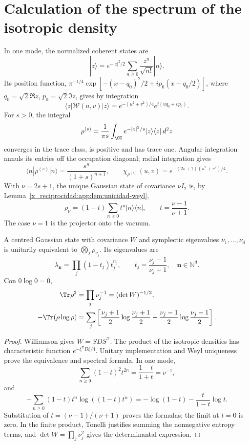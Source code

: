 \section{Calculation of the spectrum of the isotropic density}
In one mode, the normalized coherent states are
\[
 |z\rangle=e^{-|z|^2/2}\sum_{n\geq0}\frac{z^n}{\sqrt{n!}}|n\rangle.
\]
Its position function,
\(\pi^{-1/4}\exp[-(x-q_0)^2/2+ip_0(x-q_0/2)]\), where
\(q_0=\sqrt2\Re z\), \(p_0=\sqrt2\Im z\), gives by integration
\[
 \langle z|\mathcal W(u,v)|z\rangle
 =e^{-(u^2+v^2)/4}e^{i(uq_0+vp_0)}.
\]
For \(s>0\), the integral
\[
 \rho^{(s)}=\frac1{\pi s}\int_{\CC} e^{-|z|^2/s}
 |z\rangle\langle z|\,d^2z
\]
converges in the trace class, is positive and has trace one. Angular
integration annuls its entries off the occupation diagonal;
radial integration gives
\[
 \langle n|\rho^{(s)}|n\rangle=\frac{s^n}{(1+s)^{n+1}},\qquad
 \chi_{\rho^{(s)}}(u,v)=e^{-(2s+1)(u^2+v^2)/4}.
\]
With \(\nu=2s+1\), the unique Gaussian state of covariance
\(\nu I_2\) is, by Lemma~\ref{x_reciprocidad:app:lem:unicidad-weyl},
\begin{equation}
 \rho_\nu=(1-t)\sum_{n\geq0}t^n|n\rangle\langle n|,
 \qquad t=\frac{\nu-1}{\nu+1}.
 \label{x_reciprocidad:app:eq:estado-geometrico}
\end{equation}
The case \(\nu=1\) is the projector onto the vacuum.

\begin{theorem}
\label{x_reciprocidad:app:thm:espectro-gaussiano}
A centred Gaussian state with covariance \(W\) and symplectic eigenvalues \(\nu_1,\ldots,\nu_d\) is unitarily equivalent to \(\bigotimes_j\rho_{\nu_j}\). Its eigenvalues are
\[
 \lambda_{\symbf{n}}=\prod_j(1-t_j)t_j^{n_j},\qquad
 t_j=\frac{\nu_j-1}{\nu_j+1},\quad \symbf{n}\in\mathbb N^d.
\]
Con \(0\log0=0\),
\begin{align}
 \Tr\rho^2&=\prod_j\nu_j^{-1}=(\det W)^{-1/2},
 \label{x_reciprocidad:app:eq:pureza-general}\\
 -\Tr(\rho\log\rho)&=\sum_j
 \left[\frac{\nu_j+1}{2}\log\frac{\nu_j+1}{2}
 -\frac{\nu_j-1}{2}\log\frac{\nu_j-1}{2}\right].
 \label{x_reciprocidad:app:eq:entropia-general}
\end{align}
\end{theorem}
\begin{proof}
Williamson gives \(W=SDS^{\mathsf T}\). The product of the isotropic
densities has characteristic function \(e^{-\xi^{\mathsf T}D\xi/4}\).
Unitary implementation and Weyl uniqueness prove the
equivalence and spectral formula. In one mode,
\[
 \sum_{n\geq0}(1-t)^2t^{2n}=\frac{1-t}{1+t}=\nu^{-1},
\]
and
\[
 -\sum_{n\geq0}(1-t)t^n\log((1-t)t^n)
 =-\log(1-t)-\frac{t}{1-t}\log t.
\]
Substitution of \(t=(\nu-1)/(\nu+1)\) proves the formulas; the
limit at \(t=0\) is zero. In the finite product, Tonelli justifies
summing the nonnegative entropy terms, and
\(\det W=\prod_j\nu_j^2\) gives the determinantal expression.
\end{proof}


